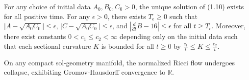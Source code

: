 \begin{proposition}
\label{ch01-prop-sol}
For any choice of initial data $A_0, B_0, C_0 > 0$, the unique solution of (1.10) exists for all positive time. For any $\epsilon > 0$, there exists $T_\epsilon \ge 0$ such that $\lvert A - \sqrt{A_0C_0} \rvert \le \epsilon$, $\lvert C - \sqrt{A_0C_0} \rvert \le \epsilon$, and $\left\lvert \frac{d}{dt} B - 16 \right\rvert \le \epsilon$ for all $t \ge T_\epsilon$. Moreover, there exist constants $0 < c_1 \le c_2 < \infty$ depending only on the initial data such that each sectional curvature $K$ is bounded for all $t \ge 0$ by $\frac{c_1}{t} \le K \le \frac{c_2}{t}$.
\end{proposition}

\begin{corollary}
\label{ch01-cor-sol-collapse}
On any compact sol-geometry manifold, the normalized Ricci flow undergoes collapse, exhibiting Gromov-Hausdorff convergence to $\mathbb{R}$.
\end{corollary}
